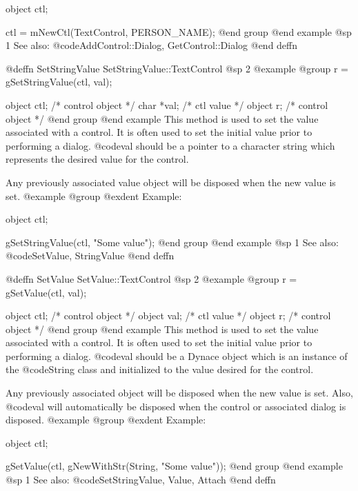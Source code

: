 object  ctl;

ctl = mNewCtl(TextControl, PERSON_NAME);
@end group
@end example
@sp 1
See also:  @code{AddControl::Dialog, GetControl::Dialog}
@end deffn










@deffn {SetStringValue} SetStringValue::TextControl
@sp 2
@example
@group
r = gSetStringValue(ctl, val);

object  ctl;    /*  control object  */
char    *val;   /*  ctl value       */
object  r;      /*  control object  */
@end group
@end example
This method is used to set the value associated with a control.  It is
often used to set the initial value prior to performing a dialog.
@code{val} should be a pointer to a character string which represents
the desired value for the control.

Any previously associated value object will be disposed when the new
value is set.  
@example
@group
@exdent Example:

object  ctl;

gSetStringValue(ctl, "Some value");
@end group
@end example
@sp 1
See also:  @code{SetValue, StringValue}
@end deffn








@deffn {SetValue} SetValue::TextControl
@sp 2
@example
@group
r = gSetValue(ctl, val);

object  ctl;    /*  control object  */
object  val;    /*  ctl value       */
object  r;      /*  control object  */
@end group
@end example
This method is used to set the value associated with a control.  It is
often used to set the initial value prior to performing a dialog.
@code{val} should be a Dynace object which is an instance of the
@code{String} class and initialized to the value desired for the control.

Any previously associated object will be disposed when the new value is set.
Also, @code{val} will automatically be disposed when the control or associated
dialog is disposed.
@example
@group
@exdent Example:

object  ctl;

gSetValue(ctl, gNewWithStr(String, "Some value"));
@end group
@end example
@sp 1
See also:  @code{SetStringValue, Value, Attach}
@end deffn









